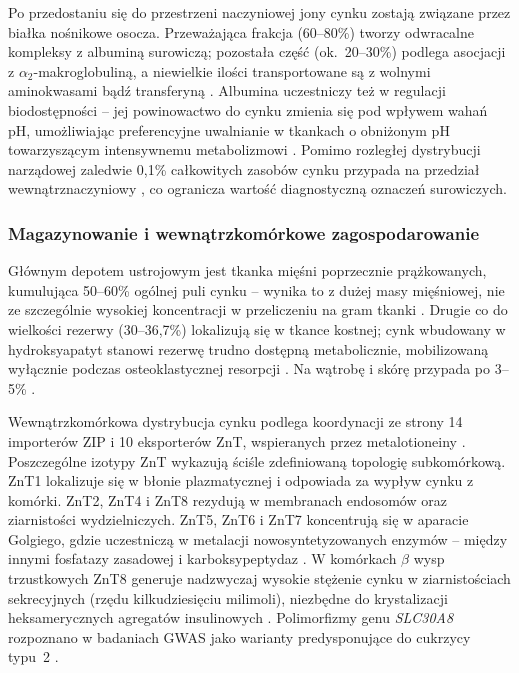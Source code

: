 \documentclass[12pt,a4paper]{article}
\begin{document}
Po przedostaniu się do przestrzeni naczyniowej jony cynku zostają związane przez białka nośnikowe osocza. Przeważająca frakcja (60--80\%) tworzy odwracalne kompleksy z albuminą surowiczą; pozostała część (ok.\ 20--30\%) podlega asocjacji z \(\alpha_2\)-makroglobuliną, a niewielkie ilości transportowane są z wolnymi aminokwasami bądź transferyną \cite{hara2017, maares2020, stiles2024}. Albumina uczestniczy też w regulacji biodostępności -- jej powinowactwo do cynku zmienia się pod wpływem wahań pH, umożliwiając preferencyjne uwalnianie w tkankach o obniżonym pH towarzyszącym intensywnemu metabolizmowi \cite{stiles2024}. Pomimo rozległej dystrybucji narządowej zaledwie 0,1\% całkowitych zasobów cynku przypada na przedział wewnątrznaczyniowy \cite{hara2017}, co ogranicza wartość diagnostyczną oznaczeń surowiczych.

\subsubsection*{Magazynowanie i wewnątrzkomórkowe zagospodarowanie}

Głównym depotem ustrojowym jest tkanka mięśni poprzecznie prążkowanych, kumulująca 50--60\% ogólnej puli cynku -- wynika to z dużej masy mięśniowej, nie ze szczególnie wysokiej koncentracji w przeliczeniu na gram tkanki \cite{hara2017, stiles2024}. Drugie co do wielkości rezerwy (30--36,7\%) lokalizują się w tkance kostnej; cynk wbudowany w hydroksyapatyt stanowi rezerwę trudno dostępną metabolicznie, mobilizowaną wyłącznie podczas osteoklastycznej resorpcji \cite{hara2017}. Na wątrobę i skórę przypada po 3--5\% \cite{hara2017, stiles2024}.

Wewnątrzkomórkowa dystrybucja cynku podlega koordynacji ze strony 14 importerów ZIP i 10 eksporterów ZnT, wspieranych przez metalotioneiny \cite{hara2017, kambe2015}. Poszczególne izotypy ZnT wykazują ściśle zdefiniowaną topologię subkomórkową. ZnT1 lokalizuje się w błonie plazmatycznej i odpowiada za wypływ cynku z komórki. ZnT2, ZnT4 i ZnT8 rezydują w membranach endosomów oraz ziarnistości wydzielniczych. ZnT5, ZnT6 i ZnT7 koncentrują się w aparacie Golgiego, gdzie uczestniczą w metalacji nowosyntetyzowanych enzymów -- między innymi fosfatazy zasadowej i karboksypeptydaz \cite{hara2017, kambe2015}. W komórkach \(\beta\) wysp trzustkowych ZnT8 generuje nadzwyczaj wysokie stężenie cynku w ziarnistościach sekrecyjnych (rzędu kilkudziesięciu milimoli), niezbędne do krystalizacji heksamerycznych agregatów insulinowych \cite{hara2017, stiles2024}. Polimorfizmy genu \textit{SLC30A8} rozpoznano w badaniach GWAS jako warianty predysponujące do cukrzycy typu~2 \cite{tamura2021}.
\end{document}
